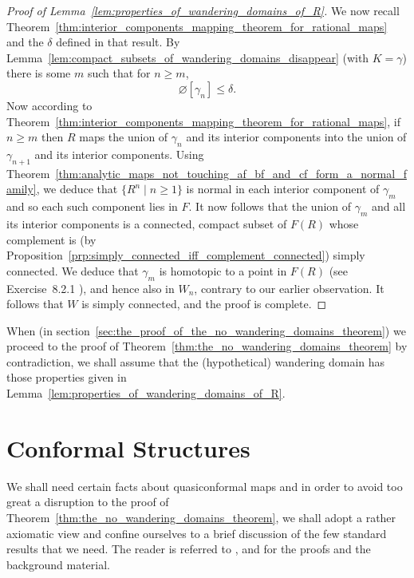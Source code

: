 \begin{proof}[Proof of Lemma~\ref{lem:properties_of_wandering_domains_of_R}]
    We now recall
    Theorem~\ref{thm:interior_components_mapping_theorem_for_rational_maps} and
    the $\delta$ defined in that result. By
    Lemma~\ref{lem:compact_subsets_of_wandering_domains_disappear} (with $K =
    \gamma$) there is some $m$ such that for $n \geq m$,
    \begin{equation*}
        \diameter[\gamma_n] \leq \delta.
    \end{equation*}
    Now according to
    Theorem~\ref{thm:interior_components_mapping_theorem_for_rational_maps}, if
    $n \geq m$ then $R$ maps the union of $\gamma_n$ and its interior components
    into the union of $\gamma_{n+1}$ and its interior components. Using
    Theorem~\ref{thm:analytic_maps_not_touching_af_bf_and_cf_form_a_normal_family},
    we deduce that $\{R^n \mid n \geq 1\}$ is normal in each interior component
    of $\gamma_m$ and so each such component lies in $F$. It now follows that
    the union of $\gamma_m$ and all its interior components is a connected,
    compact subset of $F(R)$ whose complement is (by
    Proposition~\ref{prp:simply_connected_iff_complement_connected}) simply
    connected. We deduce that $\gamma_m$ is homotopic to a point in $F(R)$ (see
    Exercise~8.2.1 \cite{Beardon1991}), and hence also in $W_n$, contrary to our
    earlier observation. It follows that $W$ is simply connected, and the proof
    is complete.
\end{proof}

\begin{remark}
    When (in section~\ref{sec:the_proof_of_the_no_wandering_domains_theorem}) we
    proceed to the proof of Theorem~\ref{thm:the_no_wandering_domains_theorem}
    by contradiction, we shall assume that the (hypothetical) wandering domain
    has those properties given in
    Lemma~\ref{lem:properties_of_wandering_domains_of_R}.
\end{remark}

\section{Conformal Structures}
\label{sec:conformal_structures}

We shall need certain facts about quasiconformal maps and in order to avoid too
great a disruption to the proof of
Theorem~\ref{thm:the_no_wandering_domains_theorem}, we shall adopt a rather
axiomatic view and confine ourselves to a brief discussion of the few standard
results that we need. The reader is referred to \cite{Ahlfors2006},
\cite{Lehto1987} and \cite{Lehto1973} for the proofs and the background
material.

